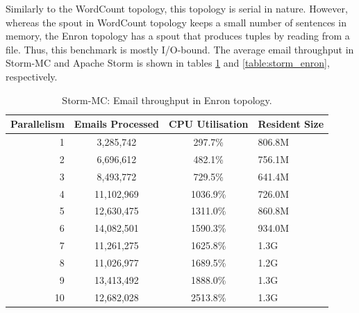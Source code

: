 Similarly to the WordCount topology, this topology is serial in nature. However, whereas the spout in  WordCount topology keeps a small number of sentences in memory, the Enron topology has a spout that produces tuples by reading from a file. Thus, this benchmark is mostly I/O-bound. The average email throughput in Storm-MC and Apache Storm is shown in tables \ref{table:storm_mc_enron} and \ref{table:storm_enron}, respectively. 

\begin{table}[!htb]
\begin{adjustwidth}{-0.5in}{-0.5in}
\centering
\small
\begin{tabular}{@{}rccl@{}}
    \textbf{Parallelism} & \textbf{Emails Processed} & \textbf{CPU Utilisation} & \textbf{Resident Size} \\ \toprule
    1 & {3,285,742} & {297.7\%} & {806.8M} \\
    2 & {6,696,612} & {482.1\%} & {756.1M} \\
    3 & {8,493,772} & {729.5\%} & {641.4M} \\
    4 & {11,102,969} & {1036.9\%} & {726.0M} \\
    5 & {12,630,475} & {1311.0\%} & {860.8M} \\
    6 & {14,082,501} & {1590.3\%} & {934.0M} \\
    7 & {11,261,275} & {1625.8\%} & {1.3G} \\
    8 & {11,026,977} & {1689.5\%} & {1.2G} \\
    9 & {13,413,492} & {1888.0\%} & {1.3G} \\
    10 & {12,682,028} & {2513.8\%} & {1.3G} \\
\end{tabular}
\caption{Storm-MC: Email throughput in Enron topology.}
\label{table:storm_mc_enron}
\end{adjustwidth}
\end{table}

